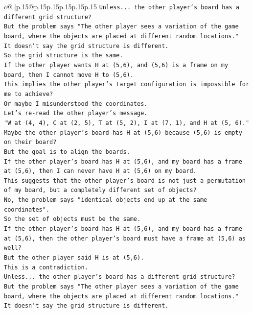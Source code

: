 \documentclass{article}
\begin{document}
{\begin{supertabular}{c@{$\;$}|p{.15\linewidth}@{}p{.15\linewidth}p{.15\linewidth}p{.15\linewidth}p{.15\linewidth}p{.15\linewidth}}
{{{\texttt{Unless... the other player's board has a different grid structure?} \\
\texttt{But the problem says "The other player sees a variation of the game board, where the objects are placed at different random locations."} \\
\texttt{It doesn't say the grid structure is different.} \\
\texttt{So the grid structure is the same.} \\
\texttt{If the other player wants H at (5,6), and (5,6) is a frame on my board, then I cannot move H to (5,6).} \\
\texttt{This implies the other player's target configuration is impossible for me to achieve?} \\
\texttt{Or maybe I misunderstood the coordinates.} \\
\texttt{Let's re{-}read the other player's message.} \\
\texttt{"W at (4, 4), C at (2, 5), T at (5, 2), I at (7, 1), and H at (5, 6)."} \\
\texttt{Maybe the other player's board has H at (5,6) because (5,6) is empty on their board?} \\
\texttt{But the goal is to align the boards.} \\
\texttt{If the other player's board has H at (5,6), and my board has a frame at (5,6), then I can never have H at (5,6) on my board.} \\
\texttt{This suggests that the other player's board is not just a permutation of my board, but a completely different set of objects?} \\
\texttt{No, the problem says "identical objects end up at the same coordinates".} \\
\texttt{So the set of objects must be the same.} \\
\texttt{If the other player's board has H at (5,6), and my board has a frame at (5,6), then the other player's board must have a frame at (5,6) as well?} \\
\texttt{But the other player said H is at (5,6).} \\
\texttt{This is a contradiction.} \\
\texttt{Unless... the other player's board has a different grid structure?} \\
\texttt{But the problem says "The other player sees a variation of the game board, where the objects are placed at different random locations."} \\
\texttt{It doesn't say the grid structure is different.} \\
}}}
\end{supertabular}}
\end{document}
